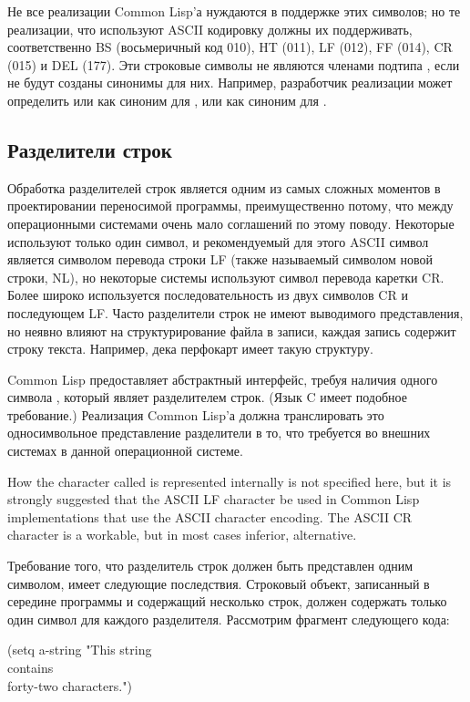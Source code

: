 Не все реализации Common Lisp'а нуждаются в поддержке этих символов; но те
реализации, что используют ASCII кодировку должны их поддерживать,
соответственно BS (восьмеричный код 010), HT (011), LF (012), FF (014), CR
(015) и DEL (177). Эти строковые символы не являются членами подтипа
, если не будут созданы синонимы для них.
Например, разработчик реализации может 
определить  или  как
синоним для ,
или  как синоним для .

\subsection{Разделители строк}

Обработка разделителей строк является одним из самых сложных моментов в
проектировании переносимой программы, преимущественно потому, что между
операционными системами очень мало соглашений по этому поводу. Некоторые
используют только один символ, и рекомендуемый для этого ASCII символ является
символом перевода строки LF (также называемый символом новой строки, NL),
но некоторые системы используют символ перевода каретки CR. Более
широко используется последовательность из двух символов CR и последующем
LF. Часто разделители строк не имеют выводимого представления, но неявно влияют
на структурирование файла в записи, каждая запись содержит строку
текста. Например, дека перфокарт имеет такую структуру.

Common Lisp предоставляет абстрактный интерфейс, требуя наличия одного символа
, который являет разделителем строк. (Язык C имеет
подобное требование.)
Реализация Common Lisp'а должна транслировать это односимвольное представление
разделители в то, что требуется во внешних системах в данной операционной системе.

\beforenoterule
\begin{implementation}
How the character called  is represented
internally is not specified here, but it is strongly suggested that
the ASCII LF character be used in Common Lisp implementations that use the
ASCII character encoding.  The ASCII CR character is a workable,
but in most cases inferior, alternative.
\end{implementation}
\afternoterule

Требование того, что разделитель строк должен быть представлен одним символом,
имеет следующие последствия. Строковый объект, записанный в середине программы и
содержащий несколько строк, должен содержать только один символ для каждого
разделителя. Рассмотрим фрагмент следующего кода:
\begin{lisp}
(setq a-string "This string \\
contains \\
forty-two characters.")
\end{lisp}

